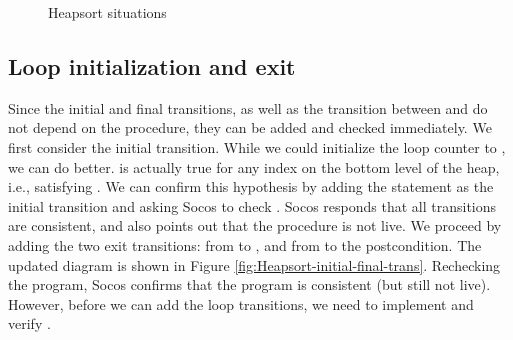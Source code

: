 \documentclass[english,submission]{eptcs}
\begin{document}
\begin{figure}
\begin{centering}
\begin{tikzpicture}
\end{tikzpicture}
\par\end{centering}

\caption{Heapsort situations\label{fig:Heapsort-skeleton}}
\end{figure}



\subsection{Loop initialization and exit}

Since the initial and final transitions, as well as the transition
between  and  do not depend on
the  procedure, they can be added and checked
immediately. We first consider the initial transition. While we could
initialize the loop counter to , we can do better.
 is actually true for any index
 on the bottom level of the heap, i.e., satisfying
.  We can confirm this
hypothesis by adding the statement  as
the initial transition and asking Socos to check
. Socos responds that all transitions are
consistent, and also points out that the procedure is not live. We
proceed by adding the two exit transitions: from 
to , and from  to the
postcondition.  The updated diagram is shown in Figure
\ref{fig:Heapsort-initial-final-trans}.  Rechecking the program, Socos
confirms that the program is consistent (but still not live). However,
before we can add the loop transitions, we need to implement and
verify .
\end{document}
